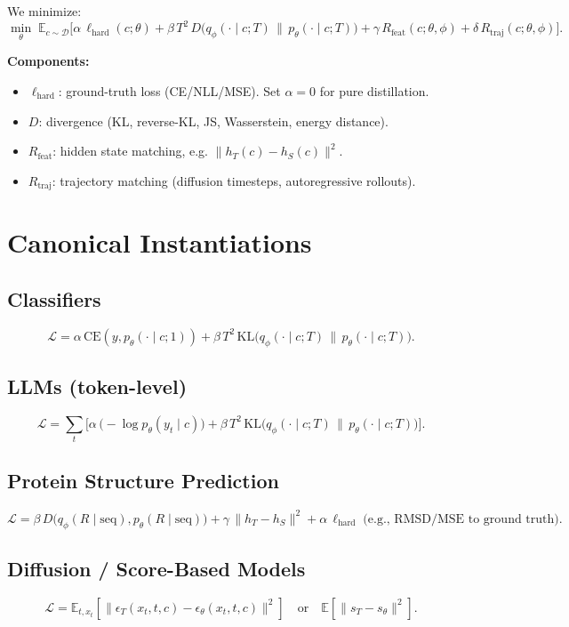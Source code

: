 \documentclass[11pt]{article}
\newcommand{\E}{\mathbb{E}}
\newcommand{\KL}{\mathrm{KL}}
\theoremstyle{remark}
\begin{document}
We minimize:
\[
\min_{\theta} \;
\E_{c \sim \mathcal{D}} \Big[
    \alpha \, \ell_{\text{hard}}(c;\theta)
    + \beta \, T^{2} \, D\!\big(q_\phi(\cdot \mid c;T)\,\|\,p_\theta(\cdot \mid c;T)\big)
    + \gamma \, R_{\text{feat}}(c;\theta,\phi)
    + \delta \, R_{\text{traj}}(c;\theta,\phi)
\Big].
\]

\textbf{Components:}
\begin{itemize}
    \item $\ell_{\text{hard}}$: ground-truth loss (CE/NLL/MSE). Set $\alpha=0$ for pure distillation.
    \item $D$: divergence (KL, reverse-KL, JS, Wasserstein, energy distance).
    \item $R_{\text{feat}}$: hidden state matching, e.g. $\|h_T(c)-h_S(c)\|^2$.
    \item $R_{\text{traj}}$: trajectory matching (diffusion timesteps, autoregressive rollouts).
\end{itemize}

\section{Canonical Instantiations}
\subsection{Classifiers}
\[
\mathcal{L}
= \alpha\,\mathrm{CE}(y, p_\theta(\cdot \mid c;1))
+ \beta\,T^{2}\,\KL\!\big(q_\phi(\cdot \mid c;T)\,\|\,p_\theta(\cdot \mid c;T)\big).
\]

\subsection{LLMs (token-level)}
\[
\mathcal{L}
= \sum_{t}\Big[
\alpha \, \big(-\log p_\theta(y_t \mid c)\big)
+ \beta \, T^{2} \,\KL\!\big(q_\phi(\cdot \mid c;T)\,\|\,p_\theta(\cdot \mid c;T)\big)
\Big].
\]

\subsection{Protein Structure Prediction}
\[
\mathcal{L}
= \beta\,D\!\big(q_\phi(R \mid \text{seq}), p_\theta(R \mid \text{seq})\big)
+ \gamma \, \|h_T - h_S\|^2
+ \alpha \,\ell_{\text{hard}} \; \text{(e.g., RMSD/MSE to ground truth)}.
\]

\subsection{Diffusion / Score-Based Models}
\[
\mathcal{L}
= \E_{t,x_t}\!\left[
\|\epsilon_T(x_t,t,c)-\epsilon_\theta(x_t,t,c)\|^2
\right]
\quad \text{or} \quad
\E\!\left[\|s_T - s_\theta\|^2\right].
\]
\end{document}
